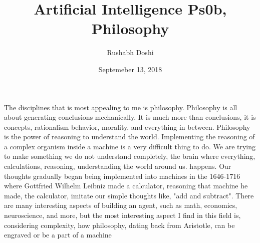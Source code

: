 \documentclass[12pt]{article}
\date{Septemeber 13, 2018}
\title{Artificial Intelligence Ps0b, Philosophy}
\author{Rushabh Doshi}
\begin{document}
\maketitle
\doublespace
The disciplines that is most appealing to me is philosophy. Philosophy is all about  generating conclusions mechanically. It is much more than conclusions, it is concepts, rationalism behavior, morality, and everything in between. Philosophy is the power of reasoning to understand the world. Implementing the reasoning of a complex organism inside a machine is a very difficult thing to do. We are trying to make something we do not understand completely, the brain where everything, calculations, reasoning, understanding the world around us. happens. Our thoughts gradually began being implemented into machines in the 1646-1716 where Gottfried Wilhelm Leibniz made a calculator, reasoning that machine he made, the calculator, imitate our simple thoughts like, "add and subtract". There are many interesting aspects of building an agent, such as math, economics, neuroscience, and more, but the most interesting aspect I find in this field is, considering  complexity, how philosophy, dating back from Aristotle, can be engraved or be a part of a machine 
\end{document}
